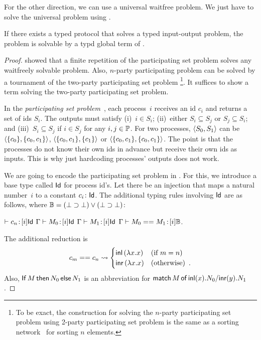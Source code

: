  For the other direction, we can use a universal waitfree problem.
 We just have to solve the universal problem using \lgd.
\begin{theorem}
 \label{th:completeness}
If there exists a typed protocol that solves a typed input-output
problem, the problem is solvable by a typd global term of \lgd.
\end{theorem}

\begin{proof}
\citet{Herlihy99} showed that a finite repetition
 of the participating set
 problem solves any waitfreely solvable problem.
 Also, $n$-party participating problem can be solved by a tournament of
 the two-party participating set problem%
 \footnote{To be exact, the construction for solving the $n$-party
 participating set problem using 2-party participating set problem
 is the same as a sorting network~\citep{batcher1968} for sorting $n$
 elements.}.
 It suffices to show a \lgd\, term solving the two-party participating
 set problem.

In the \textit{participating set problem}~\cite{borowsky},
each process~$i$ receives an id $c_i$ and
returns a set of ids $S_i$.
The outputs must satisfy (i)~$i\in S_i$; (ii)~either $S_i\subseteq S_j$
or $S_j\subseteq S_i$; and (iii)~$S_i\subseteq S_j$  if $i\in S_j$ for any
$i,j\in\mathbb{P}$.
For two processes,
$\langle{S_0, S_1}\rangle$ can be $\langle{\{c_0\}, \{c_0, c_1\}}\rangle$, $\langle{\{c_0, c_1\}, \{c_1\}}\rangle$
or $\langle{\{c_0, c_1\}, \{c_0, c_1\}}\rangle$.
 The point is that the processes do not know their own ids in advance
 but receive their own ids as inputs.
 This is why just hardcoding processes' outputs does not work.

We are going to encode the participating set problem in \lgd.
For this, we introduce a base type called $\mathsf{Id}$ for process id's.
Let there be an injection that maps a natural number~$i$ to a constant
$c_i\colon\mathsf{Id}$.
The additional typing rules involving $\mathsf{Id}$ are as follows, where $\mathbb{B} = (\bot\supset\bot)\vee(\bot\supset\bot)$:
\begin{center}
 \UnaryRule{}{}
 {$\vdash {c_n} \mathord{\colon\kern -2pt}{[i]\mathsf{Id}}$}
 \hfill
 \BinaryRule
 {$\Gamma\vdash {M_0} \mathord{\colon\kern -2pt}{[}i]\mathsf{Id}$}
 {$\Gamma\vdash {M_1} \mathord{\colon\kern -2pt}{[}i]\mathsf{Id}$}
 {}
 {$\Gamma \vdash {{M_0} == {M_1}} \mathord{\colon\kern -2pt}{[i]\mathbb{B}}$}\enspace.
\end{center}
The additional reduction is
\[
 c_m == c_n \rightsquigarrow
\begin{cases}
 \mathsf{inl}\left({\lambda x.x}\right)& (\text{if } m = n)\\
 \mathsf{inr}\left({\lambda x.x}\right)& (\text{otherwise})\enspace.
\end{cases}
\]
Also,
${\mathsf{If}\, {M}\, \mathsf{then}\, {N_0}\, \mathsf{else}\, {N_1}}$
is an abbreviation for
${\mathsf{match}\,{M}\,\mathsf{of}\, \mathsf{inl}({x}). {N_0}/ \mathsf{inr}({y}). {N_1}}$.


\end{proof}
